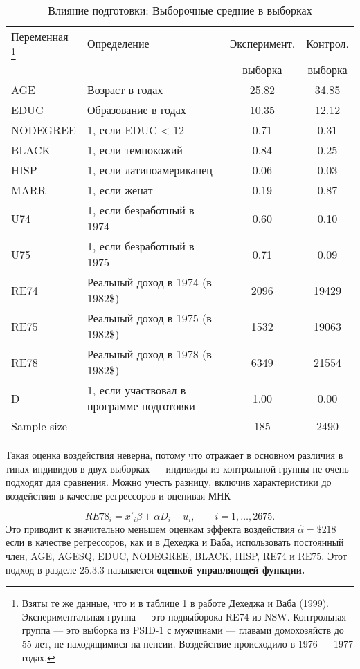\begin{table}
\caption{\label{tab:subsample} Влияние подготовки: Выборочные средние в выборках}
\begin{minipage}{17.5cm}
\begin{center}
\begin{tabular}{llcc}
\hline
\hline
Переменная \footnote{Взяты те же данные, что и в таблице 1 в работе Дехеджа и Ваба (1999). Экспериментальная группа --- это подвыборока RE74 из NSW. Контрольная группа --- это выборка из PSID-1 с мужчинами --- главами домохозяйств до 55 лет, не находящимися на пенсии. Воздействие происходило в 1976 --- 1977 годах.} & Определение & Эксперимент. &  Контрол. \\
 & & выборка & выборка\\
\hline
AGE & Возраст в годах & 25.82 & 34.85 \\
EDUC & Образование в годах & 10.35 & 12.12 \\
NODEGREE & 1, если EDUC < 12 & 0.71 & 0.31 \\
BLACK & 1, если темнокожий & 0.84 & 0.25 \\
HISP & 1, если латиноамериканец & 0.06 & 0.03 \\
MARR & 1, если женат & 0.19 & 0.87 \\
U74 & 1, если безработный в 1974 & 0.60 & 0.10 \\
U75 & 1, если безработный в 1975 & 0.71 & 0.09 \\
RE74 & Реальный доход в 1974 (в 1982\$) & 2096 & 19429 \\
RE75 & Реальный доход в 1975 (в 1982\$) & 1532 & 19063 \\
RE78 & Реальный доход в 1978 (в 1982\$) & 6349 & 21554 \\
D & 1, если участвовал в программе подготовки & 1.00 & 0.00 \\
Sample size &  & 185 & 2490 \\
\hline
\hline
\end{tabular}
\end{center}
\end{minipage}
\end{table}

Такая оценка воздействия неверна, потому что отражает в основном различия в типах индивидов в двух выборках --- индивиды из контрольной группы не очень подходят для сравнения. Можно учесть разницу, включив характеристики до воздействия в качестве регрессоров и оценивая МНК

\begin{equation}
\label{eq25.76}
RE78_i = x'_i \beta + \alpha D_i+ u_i, \qquad i = 1, \dots, 2675. 
\end{equation}
Это приводит к значительно меньшем оценкам эффекта воздействия $\widehat{\alpha} = \$ 218$ если в качестве регрессоров, как и в Дехеджа и Ваба, использовать постоянный член, AGE, AGESQ, EDUC, NODEGREE, BLACK, HISP, RE74 и RE75. Этот подход в разделе 25.3.3 называется \bfseries оценкой управляющей функции. \mdseries 

